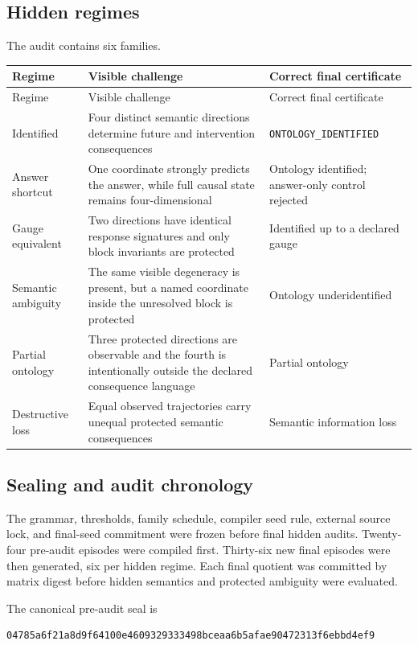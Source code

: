 \subsection{Hidden regimes}

The audit contains six families.

\begin{longtable}{@{}p{}p{}p{}@{}}
\toprule
Regime & Visible challenge & Correct final certificate \\
\midrule
\endfirsthead
\toprule
Regime & Visible challenge & Correct final certificate \\
\midrule
\endhead
Identified & Four distinct semantic directions determine future and intervention consequences & \texttt{ONTOLOGY\_IDENTIFIED} \\
Answer shortcut & One coordinate strongly predicts the answer, while full causal state remains four-dimensional & Ontology identified; answer-only control rejected \\
Gauge equivalent & Two directions have identical response signatures and only block invariants are protected & Identified up to a declared gauge \\
Semantic ambiguity & The same visible degeneracy is present, but a named coordinate inside the unresolved block is protected & Ontology underidentified \\
Partial ontology & Three protected directions are observable and the fourth is intentionally outside the declared consequence language & Partial ontology \\
Destructive loss & Equal observed trajectories carry unequal protected semantic consequences & Semantic information loss \\
\bottomrule
\end{longtable}

\subsection{Sealing and audit chronology}

The grammar, thresholds, family schedule, compiler seed rule, external source lock, and final-seed commitment were frozen before final hidden audits.  Twenty-four pre-audit episodes were compiled first.  Thirty-six new final episodes were then generated, six per hidden regime.  Each final quotient was committed by matrix digest before hidden semantics and protected ambiguity were evaluated.

The canonical pre-audit seal is
\begin{verbatim}
04785a6f21a8d9f64100e4609329333498bceaa6b5afae90472313f6ebbd4ef9
\end{verbatim}

